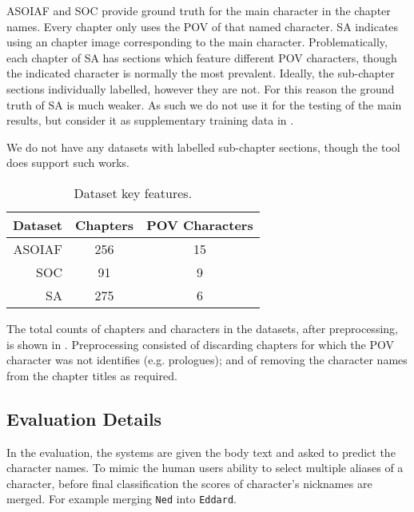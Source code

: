 \documentclass[11pt,a4paper]{article}
\newcommand{\parencite}{\citep}
\begin{document}
ASOIAF and SOC provide ground truth for the main character in the chapter names.
Every chapter only uses the POV of that named character.
SA indicates using an chapter image corresponding to the main character.
Problematically, each chapter of SA has sections which feature different POV characters, though the indicated character is normally the most prevalent.
Ideally, the sub-chapter sections individually labelled, however they are not.
For this reason the ground truth of SA is much weaker.
As such we do not use it for the testing of the main results,
but consider it as supplementary training data in .

We do not have any datasets with labelled sub-chapter sections, though the tool does support such works.


\begin{table}
	\begin{tabular}{rcc}
		Dataset & Chapters & POV Characters\\
		\toprule
		ASOIAF  & 256	&	15\\
		SOC		& 91	&	9\\
		SA		& 275	&	6
	\end{tabular}
	\caption{Dataset key features. \label{tbl:datasets}}
\end{table}

The total counts of chapters and characters in the datasets, after preprocessing, is shown in .
Preprocessing consisted of  discarding chapters for which the POV character was not identifies (e.g. prologues); and of removing the character names from the chapter titles as required.

\subsection{Evaluation Details}
In the evaluation, the systems are given the body text and asked to predict the character names.
To mimic the human users ability to select multiple aliases of a character, before final classification the scores of character's nicknames are merged.
For example merging \texttt{Ned} into \texttt{Eddard}.

%
\end{document}
